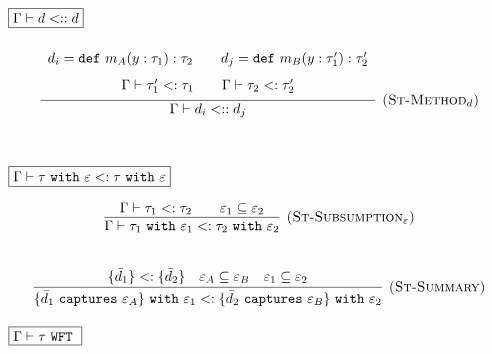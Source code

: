 \documentclass{llncs}
\newcommand{\keywadj}[1]{\mathtt{#1}}
\newcommand{\keyw}[1]{\keywadj{#1}~}
\newcommand{\kw}[1]{\keyw{ #1 }}
\newcommand{\type}[2]{
	#1~\keyw{with} #2
}
\begin{document}
\noindent
$\fbox{$\Gamma \vdash d <:: d$}$

\[
\begin{array}{c}

\infer[\textsc{(St-Method$_d$)}]
	{ \Gamma \vdash d_i <:: d_j }
{{\def\arraystretch{1.6}
  \begin{array}{c}
d_i = \kw{def} m_A(y : \tau_1) : \tau_2 ~~~~~~ d_j = \kw{def} m_B(y : \tau_1') : \tau_2' \\
\Gamma \vdash \tau_1' <: \tau_1 ~~~~~~ \Gamma \vdash \tau_2 <: \tau_2'
  \end{array}}} \\[5ex]

\end{array}
\]

\noindent
$\fbox{$\Gamma \vdash \tau~\kw{with} \varepsilon <: \tau~\kw{with} \varepsilon$}$

\[
\begin{array}{c}

\infer[\textsc{(St-Subsumption$_\varepsilon$)}]
	{ \Gamma \vdash \type{\tau_1}{\varepsilon_1} <: \type{\tau_2}{\varepsilon_2}}
	{ \Gamma \vdash \tau_1 <: \tau_2 ~~~~~~ \varepsilon_1 \subseteq \varepsilon_2} \\[5ex]

\infer[\textsc{(St-Summary)}]
	{ \{ \bar d_1~\kw{captures} \varepsilon_A \}~\kw{with} \varepsilon_1 <: \{ \bar d_2~\kw{captures} \varepsilon_B \}~\kw{with} \varepsilon_2 }
	{ \{ \bar d_1 \} <: \{ \bar d_2 \} & \varepsilon_A \subseteq \varepsilon_B & \varepsilon_1 \subseteq \varepsilon_2 }

\end{array}
\]

\noindent
$\fbox{$\Gamma \vdash \tau~\kw{WFT}$}$
\end{document}
